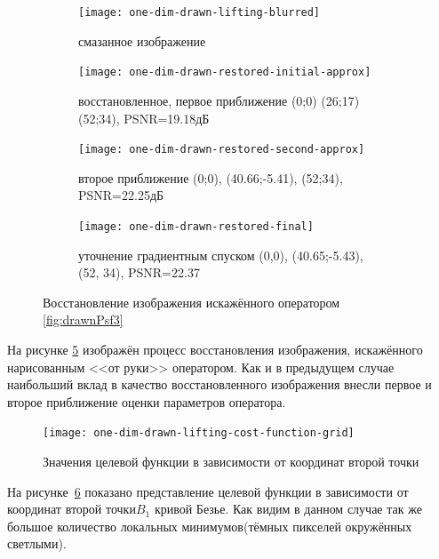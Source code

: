\begin{figure}[h!]
	\centering
	\begin{subfigure}[t]{0.475\textwidth}
		\centering
		\texttt{[image: one-dim-drawn-lifting-blurred]}
		\caption{смазанное изображение}
		\label{fig:oneDimDrawnLiftingBlurred}
	\end{subfigure}
	\hfill
	\begin{subfigure}[t]{0.475\textwidth}
		\centering
		\texttt{[image: one-dim-drawn-restored-initial-approx]}
		\caption{восстановленное, первое приближение (0;0) (26;17) (52;34), PSNR=19.18дБ}
		\label{fig:oneDimDrawnLiftingInitial}
	\end{subfigure}


	\begin{subfigure}[t]{0.475\textwidth}
		\centering
		\texttt{[image: one-dim-drawn-restored-second-approx]}
		\caption{второе приближение (0;0), (40.66;-5.41), (52;34), PSNR=22.25дБ}
		\label{fig:oneDimDrawnLiftingSecond}
	\end{subfigure}
	\hfill
	\begin{subfigure}[t]{0.475\textwidth}
		\centering
		\texttt{[image: one-dim-drawn-restored-final]}
		\caption{уточнение градиентным спуском (0,0), (40.65;-5.43), (52, 34), PSNR=22.37}
		\label{fig:oneDimDrawnLiftingFinal}
	\end{subfigure}
	\caption{Восстановление изображения искажённого оператором \ref{fig:drawnPsf3}}
	\label{fig:oneDimDrawnLifting}
\end{figure}
На рисунке \ref{fig:oneDimDrawnLifting} изображён процесс восстановления изображения, искажённого нарисованным <<от руки>> оператором. Как и в предыдущем случае наибольший вклад в качество восстановленного изображения внесли первое и второе приближение оценки параметров оператора.

\begin{figure}[h!]
	\centering
	\texttt{[image: one-dim-drawn-lifting-cost-function-grid]}
	\caption{Значения целевой функции в зависимости от координат второй точки}
	\label{fig:drawnCostFunction}
\end{figure}
На рисунке~\ref{fig:drawnCostFunction} показано представление целевой функции в зависимости от координат второй точки$B_1$ кривой Безье. Как видим в данном случае так же большое количество локальных минимумов(тёмных пикселей окружённых светлыми).

